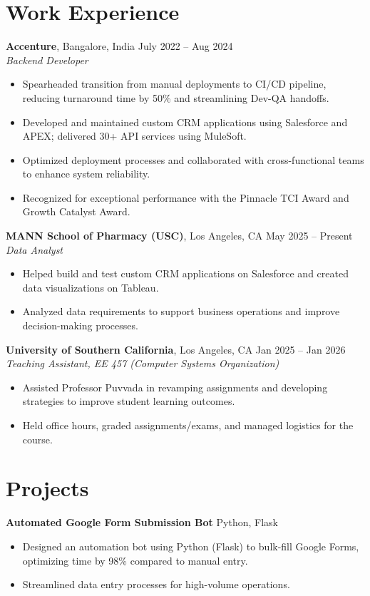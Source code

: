 \documentclass[letterpaper,10pt]{article}
\begin{document}
\section*{Work Experience}
\textbf{Accenture}, Bangalore, India \hfill July 2022 -- Aug 2024 \\
\textit{Backend Developer}
\begin{itemize}
    \item Spearheaded transition from manual deployments to CI/CD pipeline, reducing turnaround time by 50\% and streamlining Dev-QA handoffs.
    \item Developed and maintained custom CRM applications using Salesforce and APEX; delivered 30+ API services using MuleSoft.
    \item Optimized deployment processes and collaborated with cross-functional teams to enhance system reliability.
    \item Recognized for exceptional performance with the Pinnacle TCI Award and Growth Catalyst Award.
\end{itemize}

\textbf{MANN School of Pharmacy (USC)}, Los Angeles, CA \hfill May 2025 -- Present \\
\textit{Data Analyst}
\begin{itemize}
    \item Helped build and test custom CRM applications on Salesforce and created data visualizations on Tableau.
    \item Analyzed data requirements to support business operations and improve decision-making processes.
\end{itemize}

\textbf{University of Southern California}, Los Angeles, CA \hfill Jan 2025 -- Jan 2026 \\
\textit{Teaching Assistant, EE 457 (Computer Systems Organization)}
\begin{itemize}
    \item Assisted Professor Puvvada in revamping assignments and developing strategies to improve student learning outcomes.
    \item Held office hours, graded assignments/exams, and managed logistics for the course.
\end{itemize}

\section*{Projects}
\textbf{Automated Google Form Submission Bot} \hfill Python, Flask
\begin{itemize}
    \item Designed an automation bot using Python (Flask) to bulk-fill Google Forms, optimizing time by 98\% compared to manual entry.
    \item Streamlined data entry processes for high-volume operations.
\end{itemize}
\end{document}
